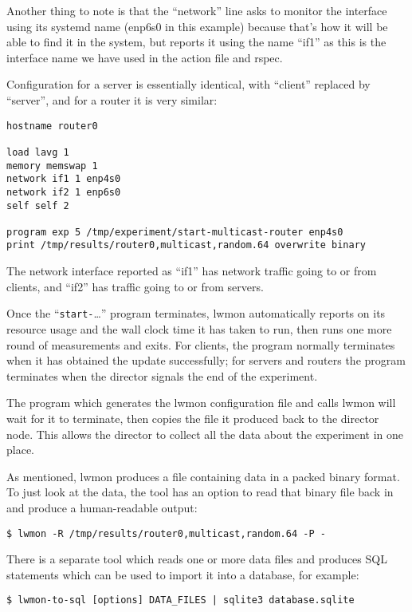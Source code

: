\documentclass[a4paper,12pt]{article}
\begin{document}
Another thing to note is that the ``network'' line asks to monitor
the interface using its systemd name (enp6s0 in this example) because
that's how it will be able to find it in the system, but reports it
using the name ``if1'' as this is the interface name we have used
in the action file and rspec.

Configuration for a server is essentially identical, with ``client''
replaced by ``server'', and for a router it is very similar:

\begin{verbatim}
hostname router0

load lavg 1
memory memswap 1
network if1 1 enp4s0
network if2 1 enp6s0
self self 2

program exp 5 /tmp/experiment/start-multicast-router enp4s0
print /tmp/results/router0,multicast,random.64 overwrite binary
\end{verbatim}

The network interface reported as ``if1'' has network traffic going
to or from clients, and ``if2'' has traffic going to or from servers.

Once the ``{\tt start-}\ldots'' program terminates, lwmon automatically
reports on its resource usage and the wall clock time it has taken to run,
then runs one more round of measurements and exits.  For clients, the
program normally terminates when it has obtained the update successfully;
for servers and routers the program terminates when the director signals
the end of the experiment.

The program which generates the lwmon configuration file and calls lwmon
will wait for it to terminate, then copies the file it produced back
to the director node. This allows the director to collect all the
data about the experiment in one place.

As mentioned, lwmon produces a file containing data in a packed binary
format. To just look at the data, the tool has an option to read that
binary file back in and produce a human-readable output:

\begin{verbatim}
$ lwmon -R /tmp/results/router0,multicast,random.64 -P -
\end{verbatim}

There is a separate tool which reads one or more data files and produces
SQL statements which can be used to import it into a database, for example:

\begin{verbatim}
$ lwmon-to-sql [options] DATA_FILES | sqlite3 database.sqlite
\end{verbatim}
\end{document}
